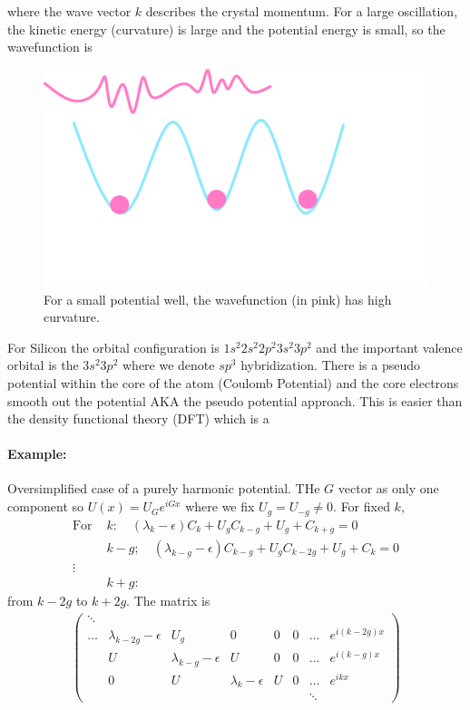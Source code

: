 \documentclass[../main.tex]{subfiles}
\begin{document}
where the wave vector $k$ describes the crystal momentum.
\pagebreak
For a large oscillation, the kinetic energy (curvature) is large and the potential energy is small,
so the wavefunction is 
\begin{figure}[ht]
    \centering
    \includegraphics[width=0.6\linewidth]{wavefunctionish.png}
    \caption{For a small potential well, the wavefunction (in pink) has high curvature.}
    \label{fig:7.2}
\end{figure}

For Silicon the orbital configuration is $1s^2 2s^2 2p^2 3s^2 3p^2$ and the important valence
orbital is the $3s^2 3p^2$ where we denote $sp^3$ hybridization. There is a pseudo potential within
the core of the atom (Coulomb Potential) and the core electrons smooth out the potential AKA the 
pseudo potential approach. This is easier than the density functional theory (DFT) which is a

\paragraph*{Example:} Oversimplified case of a purely harmonic potential. THe $G$ vector as only
one component so $U(x) = U_G e^{iGx}$ where we fix $U_g = U_{-g} \neq 0$. For fixed $k$,
\begin{align*}
    \text{For } &k:\quad  (\lambda_k - \epsilon) C_k + U_g C_{k-g} + U_g + C_{k + g} = 0 \\
    &k-g; \quad (\lambda_{k-g} - \epsilon) C_{k-g} + U_g C_{k-2g} + U_g + C_{k} = 0 \\
    \vdots \\
    &k+g:
\end{align*}
from $k - 2g$ to $k + 2g$. The matrix is
\begin{align*}
    \begin{pmatrix}
        \ddots \\
        \dots & \lambda_{k - 2g} - \epsilon & U_g & 0 & 0 & 0 & \dots & e^{i(k-2g)x} \\
        & U & \lambda_{k-g} - \epsilon & U & 0 & 0 & \dots & e^{i(k-g)x} \\
        & 0 & U & \lambda_k - \epsilon & U & 0 & \dots & e^{ikx} \\
        & & & & & & \ddots
    \end{pmatrix}
\end{align*}
\end{document}

